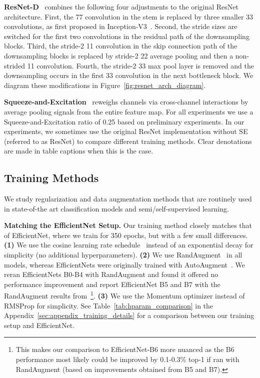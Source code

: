 \documentclass{article}
\begin{document}
\textbf{ResNet-D}~\cite{he2019bag} combines the following four adjustments to the original ResNet architecture.
First, the 77 convolution in the stem is replaced by three smaller 33 convolutions, as first proposed in Inception-V3~\cite{szegedy2016rethinking}.
Second, the stride sizes are switched for the first two convolutions in the residual path of the downsampling blocks.
Third, the stride-2 11 convolution in the skip connection path of the downsampling blocks is replaced by stride-2 22 average pooling and then a non-strided 11 convolution.
Fourth, the stride-2 33 max pool layer is removed and the downsampling occurs in the first 33 convolution in the next bottleneck block. 
We diagram these modifications in Figure~\ref{fig:resnet_arch_diagram}.

\textbf{Squeeze-and-Excitation}~\cite{hu2018squeeze} reweighs channels via cross-channel interactions by average pooling signals from the entire feature map. 
For all experiments we use a Squeeze-and-Excitation ratio of 0.25 based on preliminary experiments.
In our experiments, we sometimes use the original ResNet implementation without SE (referred to as ResNet) to compare different training methods. 
Clear denotations are made in table captions when this is the case.

\subsection{Training Methods}
We study regularization and data augmentation methods that are routinely used in state-of-the art classification models and semi/self-supervised learning.

\textbf{Matching the EfficientNet Setup.}
Our training method closely matches that of EfficientNet, where we train for 350 epochs, but with a few small differences. 
\textbf{(1)} We use the cosine learning rate schedule~\cite{loshchilov2016sgdr} instead of an exponential decay for simplicity (no additional hyperparameters). 
\textbf{(2)} We use RandAugment~\cite{cubuk2019randaugment} in all models, whereas EfficientNets were originally trained with AutoAugment~\cite{cubuk2018autoaugment}. 
We reran EfficientNets B0-B4 with RandAugment and found it offered no performance improvement and report EfficientNet B5 and B7 with the RandAugment results from~\citet{cubuk2019randaugment}\footnote{This makes our comparison to EfficientNet-B6 more nuanced as the B6 performance most likely could be improved by 0.1-0.3\% top-1 if ran with RandAugment (based on improvements obtained from B5 and B7).}.
\textbf{(3)} We use the Momentum optimizer instead of RMSProp for simplicity.
See Table~\ref{tab:hparam_comparison} in the Appendix~\ref{sec:appendix_training_details} for a comparison between our training setup and EfficientNet.
\end{document}
